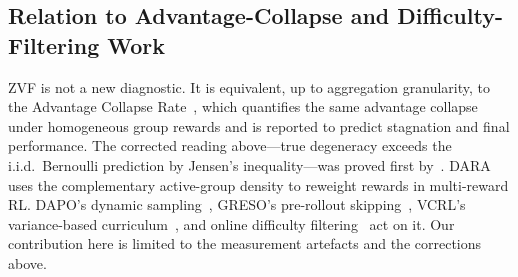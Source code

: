 \subsection{Relation to Advantage-Collapse and Difficulty-Filtering Work}
\label{sec:zvf-cross-experiment:related}
ZVF is not a new diagnostic. It is equivalent, up to aggregation
granularity, to the Advantage Collapse Rate~\cite{he2026advantage}, which
quantifies the same advantage collapse under homogeneous group rewards and is
reported to predict stagnation and final performance. The corrected reading
above---true degeneracy exceeds the i.i.d.\ Bernoulli prediction by Jensen's
inequality---was proved first by~\cite{nie2026gradstarvation}. DARA~\cite{zheng2026dara}
uses the complementary active-group density to reweight rewards in
multi-reward RL. DAPO's dynamic sampling~\cite{yu2025dapo}, GRESO's
pre-rollout skipping~\cite{zhang2026greso}, VCRL's variance-based
curriculum~\cite{jiang2025vcrl}, and online difficulty
filtering~\cite{bae2025online} act on it. Our contribution here is limited
to the measurement artefacts and the corrections above.
